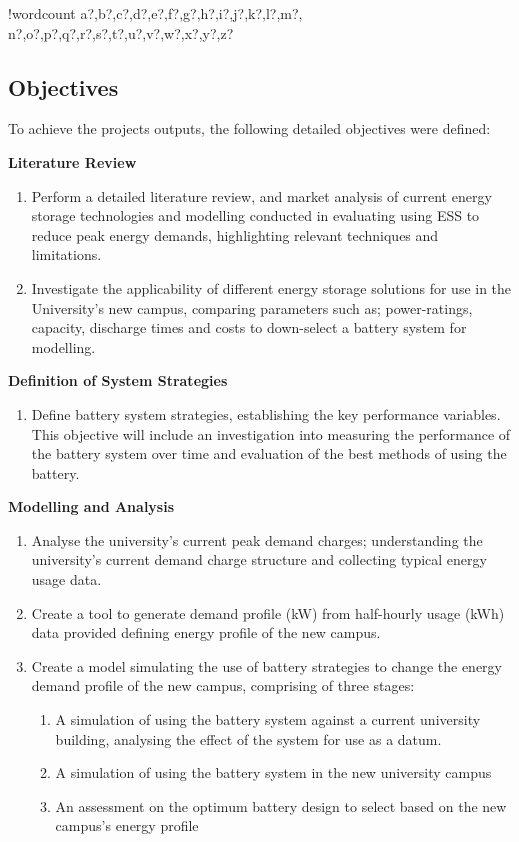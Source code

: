 \documentclass[fontsize=9.5pt]{extarticle}
\numberwithin{figure}{section} %
\newcounter{words}
\newenvironment{counted}{%
  \setcounter{words}{0}
  \SearchList!{wordcount}{\stepcounter{words}}
    {a?,b?,c?,d?,e?,f?,g?,h?,i?,j?,k?,l?,m?,
    n?,o?,p?,q?,r?,s?,t?,u?,v?,w?,x?,y?,z?}
  \UndoBoundary{'}
  \SearchOrder{p;}}{%
  \StopSearching}
\begin{document}
\begin{counted}
\subsection{Objectives}\label{objectives}

To achieve the projects outputs, the following detailed objectives were
defined:

\textbf{Literature Review}

\begin{enumerate}
\item Perform a detailed literature review, and market analysis of current energy storage technologies and modelling conducted in evaluating using ESS to reduce peak energy demands, highlighting relevant techniques and limitations.
\item Investigate the applicability of different energy storage solutions for use in the University's new campus, comparing parameters such as; power-ratings, capacity, discharge times and costs to down-select a battery system for modelling.
\end{enumerate}

\textbf{Definition of System Strategies}

\begin{enumerate}[resume]
\item Define battery system strategies, establishing the key performance variables. This objective will include an investigation into measuring the performance of the battery system over time and evaluation of the best methods of using the battery.
\end{enumerate}

\textbf{Modelling and Analysis}

\begin{enumerate}[resume]
\item Analyse the university’s current peak demand charges; understanding the university’s current demand charge structure and collecting typical energy usage data.  
\item Create a tool to generate demand profile (kW) from half-hourly usage (kWh) data provided defining energy profile of the new campus.
\item Create a model simulating the use of battery strategies to change the energy demand profile of the new campus, comprising of three stages:
\begin{enumerate}
\item A simulation of using the battery system against a current university building, analysing the effect of the system for use as a datum.
\item A simulation of using the battery system in the new university campus
\item An assessment on the optimum battery design to select based on the new campus's energy profile
\end{enumerate}
\end{enumerate}


\end{counted}
\end{document}

